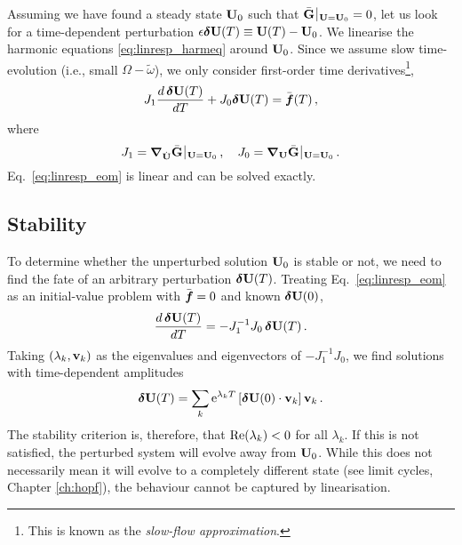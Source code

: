 Assuming we have found a steady state $\vb{U}_0$ such that $\bar{\vb{G}}\, \vline\,_{\vb{U} = \vb{U}_0} = 0$, let us look for a time-dependent perturbation $\epsilon \boldsymbol{\delta} \vb{U}(T) \equiv \vb{U}(T) - \vb{U}_0$. We linearise the harmonic equations \eqref{eq:linresp_harmeq} around $\vb{U}_0$. Since we assume slow time-evolution (i.e., small $\Omega - \tilde{\omega} $), we only consider first-order time derivatives\footnote{This is known as the \textit{slow-flow approximation}.},
\begin{equation} \label{eq:linresp_eom}
J_1 \frac{d \, \boldsymbol{\delta} \vb{U} (T)}{d T} + J_0 \boldsymbol{\delta} \vb{U}(T) = \bar{\boldsymbol{f}}(T)\,,
\end{equation}
where 
\begin{equation}
J_1 = \boldsymbol{\nabla}_{\dot{\vb{U}}} \bar{\vb{G}}\, \vline\,_{\vb{U} = \vb{U}_0} \,, \quad J_0 = \boldsymbol{\nabla}_{\vb{U}} \bar{\vb{G}}\, \vline\,_{\vb{U} = \vb{U}_0} \,.
\end{equation}
Eq.~\eqref{eq:linresp_eom} is linear and can be solved exactly.
\subsection{Stability}

To determine whether the unperturbed solution $\vb{U}_0$ is stable or not, we need to find the fate of an arbitrary perturbation $\boldsymbol{\delta} \vb{U}(T)$. Treating Eq.~\eqref{eq:linresp_eom} as an initial-value problem with $\bar{\boldsymbol{f}} =0$ and known $\boldsymbol{\delta} \vb{U}(0)$,
\begin{equation} \label{eq:linresp_eom_pert}
\frac{d \, \boldsymbol{\delta} \vb{U} (T)}{d T} = - J_1^{-1} J_0\, \boldsymbol{\delta} \vb{U}(T) \,.
\end{equation}
Taking $(\lambda_k, \vb{v}_k)$ as the eigenvalues and eigenvectors of $-J_1^{-1} J_0$, we find solutions with time-dependent amplitudes
\begin{equation}
\boldsymbol{\delta} \vb{U}(T) = \sum_k {\rm e}^{\lambda_k T } \left[ \boldsymbol{\delta} \vb{U}(0) \cdot \vb{v}_k \right] \vb{v}_k \,.
\end{equation}
The stability criterion is, therefore, that $\text{Re} (\lambda_k) < 0$ for all $\lambda_k$. If this is not satisfied, the perturbed system will evolve away from $\vb{U}_0$. While this does not necessarily mean it will evolve to a completely different state (see limit cycles, Chapter \ref{ch:hopf}), the behaviour cannot be captured by linearisation.

